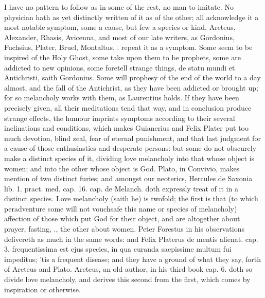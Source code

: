 {I have no pattern to follow as in some of the rest, no man to imitate.
No physician hath as yet distinctly written of it as of the other; all
acknowledge it a most notable symptom, some a cause, but few a species
or kind. Areteus, Alexander, Rhasis, Avicenna, and most of our
late writers, as Gordonius, Fuchsius, Plater, Bruel, Montaltus, \etc{}.
repeat it as a symptom. Some seem to be inspired of the Holy
Ghost, some take upon them to be prophets, some are addicted to new
opinions, some foretell strange things, de statu mundi et Antichristi,
saith Gordonius. Some will prophesy of the end of the world to a day
almost, and the fall of the Antichrist, as they have been addicted or
brought up; for so melancholy works with them, as Laurentius
holds. If they have been precisely given, all their meditations tend
that way, and in conclusion produce strange effects, the humour
imprints symptoms according to their several inclinations and
conditions, which makes Guianerius and Felix Plater put too
much devotion, blind zeal, fear of eternal punishment, and that last
judgment for a cause of those enthusiastics and desperate persons: but
some do not obscurely make a distinct species of it, dividing love
melancholy into that whose object is women; and into the other whose
object is God. Plato, in Convivio, makes mention of two distinct
furies; and amongst our neoterics, Hercules de Saxonia lib. 1. pract.
med. cap. 16. cap. de Melanch. doth expressly treat of it in a distinct
species.  Love melancholy (saith he) is twofold; the first is
that (to which peradventure some will not vouchsafe this name or
species of melancholy) affection of those which put God for their
object, and are altogether about prayer, fasting, \etc{}., the other about
women. Peter Forestus in his observations delivereth as much in the
same words: and Felix Platerus de mentis alienat. cap. 3.
frequentissima est ejus species, in qua curanda saepissime multum fui
impeditus; 'tis a frequent disease; and they have a ground of what they
say, forth of Areteus and Plato. Areteus, an old author, in his
third book cap. 6. doth so divide love melancholy, and derives this
second from the first, which comes by inspiration or otherwise.

}
